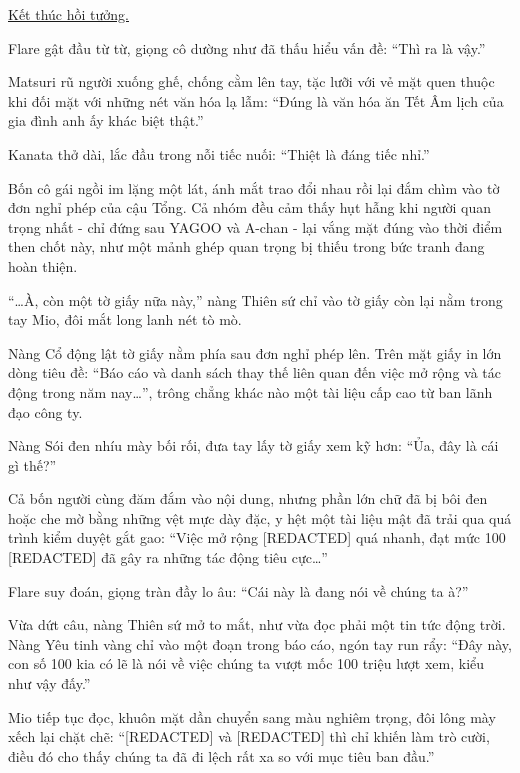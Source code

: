 \documentclass[../main.tex]{subfiles}
\begin{document}
\begin{center}
  \uline{Kết thúc hồi tưởng.}
\end{center}

Flare gật đầu từ từ, giọng cô dường như đã thấu hiểu vấn đề: ``Thì ra là vậy.''

Matsuri rũ người xuống ghế, chống cằm lên tay, tặc lưỡi với vẻ mặt quen thuộc khi đối mặt với những nét văn hóa lạ lẫm: ``Đúng là văn hóa ăn Tết Âm lịch của gia đình anh ấy khác biệt thật.''

Kanata thở dài, lắc đầu trong nỗi tiếc nuối: ``Thiệt là đáng tiếc nhỉ.''

Bốn cô gái ngồi im lặng một lát, ánh mắt trao đổi nhau rồi lại đắm chìm vào tờ đơn nghỉ phép của cậu Tổng. Cả nhóm đều cảm thấy hụt hẫng khi người quan trọng nhất - chỉ đứng sau YAGOO và A-chan - lại vắng mặt đúng vào thời điểm then chốt này, như một mảnh ghép quan trọng bị thiếu trong bức tranh đang hoàn thiện.

``\dots À, còn một tờ giấy nữa này,'' nàng Thiên sứ chỉ vào tờ giấy còn lại nằm trong tay Mio, đôi mắt long lanh nét tò mò.

Nàng Cổ động lật tờ giấy nằm phía sau đơn nghỉ phép lên. Trên mặt giấy in lớn dòng tiêu đề: ``Báo cáo và danh sách thay thế liên quan đến việc mở rộng và tác động trong năm nay\dots'', trông chẳng khác nào một tài liệu cấp cao từ ban lãnh đạo công ty.

Nàng Sói đen nhíu mày bối rối, đưa tay lấy tờ giấy xem kỹ hơn: ``Ủa, đây là cái gì thế?''

Cả bốn người cùng đăm đắm vào nội dung, nhưng phần lớn chữ đã bị bôi đen hoặc che mờ bằng những vệt mực dày đặc, y hệt một tài liệu mật đã trải qua quá trình kiểm duyệt gắt gao: ``Việc mở rộng [REDACTED] quá nhanh, đạt mức 100 [REDACTED] đã gây ra những tác động tiêu cực\dots''

Flare suy đoán, giọng tràn đầy lo âu: ``Cái này là đang nói về chúng ta à?''

Vừa dứt câu, nàng Thiên sứ mở to mắt, như vừa đọc phải một tin tức động trời. Nàng Yêu tinh vàng chỉ vào một đoạn trong báo cáo, ngón tay run rẩy: ``Đây này, con số 100 kia có lẽ là nói về việc chúng ta vượt mốc 100 triệu lượt xem, kiểu như vậy đấy.''


Mio tiếp tục đọc, khuôn mặt dần chuyển sang màu nghiêm trọng, đôi lông mày xếch lại chặt chẽ: ``[REDACTED] và [REDACTED] thì chỉ khiến làm trò cười, điều đó cho thấy chúng ta đã đi lệch rất xa so với mục tiêu ban đầu.''
\end{document}
